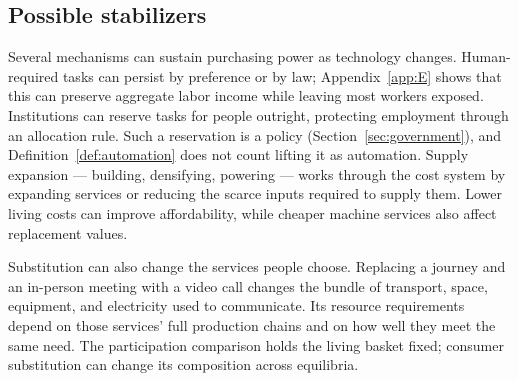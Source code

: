 \documentclass[12pt]{article}
\theoremstyle{plain}
\theoremstyle{definition}
\theoremstyle{remark}
\begin{document}
\subsection{Possible stabilizers}\label{sec:stabilizers}

Several mechanisms can sustain purchasing power as technology changes. Human-required tasks can persist by preference or by law; Appendix~\ref{app:E} shows that this can preserve aggregate labor income while leaving most workers exposed. Institutions can reserve tasks for people outright, protecting employment through an allocation rule.
Such a reservation is a policy (Section~\ref{sec:government}), and Definition~\ref{def:automation} does not count lifting it as automation.
Supply expansion --- building, densifying, powering --- works through the cost system by expanding services or reducing the scarce inputs required to supply them. Lower living costs can improve affordability, while cheaper machine services also affect replacement values.

Substitution can also change the services people choose. Replacing a journey and an in-person meeting with a video call changes the bundle of transport, space, equipment, and electricity used to communicate. Its resource requirements depend on those services' full production chains and on how well they meet the same need. The participation comparison holds the living basket fixed; consumer substitution can change its composition across equilibria.
\end{document}
